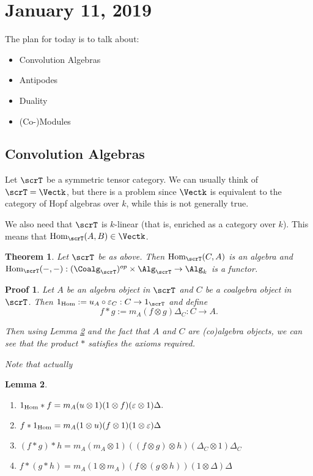 \documentclass[12pt]{article}
\theoremstyle{break}
\theoremstyle{nonumberbreak}
\theoremstyle{changebreak}
\newtheorem{thm}{Theorem}[subsection]
\newtheorem{lem}[thm]{Lemma}
\theoremstyle{break}
\theoremstyle{nonumberbreak}
\newtheorem{prf}{Proof}
\theoremstyle{nonumberplain}
\theoremstyle{change}
\newcommand*{\Hom}{\ensuremath\text{Hom}}
\begin{document}
\section{January 11, 2019}
The plan for today is to talk about:
\begin{itemize}
	\item Convolution Algebras
	\item Antipodes
	\item Duality
	\item (Co-)Modules
\end{itemize}

\subsection{Convolution Algebras}
 Let $\scrT$ be a symmetric tensor category. We can usually think of $\scrT=\Vectk$, but 
 there is a problem since $\Vectk$ is equivalent to the category of Hopf algebras over $k$,
 while this is not generally true.

 We also need that $\scrT$ is $k$-linear (that is, enriched as a category over $k$). This
 means that $\Hom_\scrT (A,B)\in\Vectk$.

 \begin{thm}
	Let $\scrT$ be as above. Then $\Hom_\scrT(C,A)$ is an algebra and $\Hom_\scrT(-,-):(\Coalg_\scrT)^{op}\times\Alg_\scrT\to\Alg_k$
	is a functor.
 \end{thm}
 \begin{prf}
	Let $A$ be an algebra object in $\scrT$ and $C$ be a coalgebra object in $\scrT$. Then $1_{\Hom} :=u_A\circ\varepsilon_C:C\to 1_\scrT$ and define
	\[f\ast g := m_A(f\otimes g)\Delta_C:C\to A.\]

	Then using Lemma \ref{lem-func} and the fact that $A$ and $C$ are (co)algebra objects,
	we can see that the product $\ast$ satisfies the axioms required.

	Note that actually
 \end{prf}
 \begin{lem}
	\begin{enumerate}
		\item $1_{\Hom}\ast f = m_A(u\otimes 1)(1\otimes f)(\varepsilon\otimes 1)\Delta.$
		\item $f\ast 1_{\Hom}=m_A(1\otimes u)(f\otimes 1)(1\otimes \varepsilon)\Delta$
		\item $(f\ast g)\ast h=m_A(m_A\otimes 1)((f\otimes g)\otimes h)(\Delta_C\otimes 1)\Delta_C$
		\item $f\ast(g\ast h)=m_A(1\otimes m_A)(f\otimes(g\otimes h))(1\otimes \Delta)\Delta$
	\end{enumerate}
	\label{lem-func}
 \end{lem}
 
\end{document}
